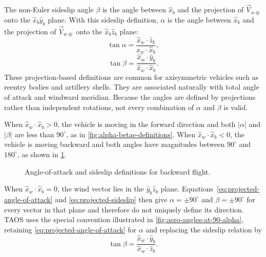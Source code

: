 
The non-Euler sideslip angle $\beta$ is the angle between $\hat x_b$ and the
projection of $\vec V_{w\oplus}$ onto the $\hat x_b\hat y_b$ plane. With this
sideslip definition, $\alpha$ is the angle between $\hat x_b$ and the projection of
$\vec V_{w\oplus}$ onto the $\hat x_b\hat z_b$ plane:
\begin{equation}
  \tan\alpha
  =\frac{\hat x_w\mathbin{\cdot}\hat z_b}
  {\hat x_w\mathbin{\cdot}\hat x_b},
  \label{eq:projected-angle-of-attack}
\end{equation}
\begin{equation}
  \tan\beta
  =\frac{\hat x_w\mathbin{\cdot}\hat y_b}
  {\hat x_w\mathbin{\cdot}\hat x_b}.
  \label{eq:projected-sideslip}
\end{equation}
These projection-based definitions are common for axisymmetric vehicles such as
reentry bodies and artillery shells. They are associated naturally with total angle of
attack and windward meridian. Because the angles are defined by projections rather
than independent rotations, not every combination of $\alpha$ and $\beta$ is valid.

When $\hat x_w\mathbin{\cdot}\hat x_b>0$, the vehicle is moving in the forward
direction and both $|\alpha|$ and $|\beta|$ are less than $90^\circ$, as in
\cref{fig:alpha-betae-definitions}. When
$\hat x_w\mathbin{\cdot}\hat x_b<0$, the vehicle is moving backward and both
angles have magnitudes between $90^\circ$ and $180^\circ$, as shown in
\cref{fig:alpha-beta-backward}.

\begin{figure}[htbp]
  \centering
  \resizebox{0.82\linewidth}{!}{}
  \caption{Angle-of-attack and sideslip definitions for backward flight.}
  \label{fig:alpha-beta-backward}
\end{figure}

When $\hat x_w\mathbin{\cdot}\hat x_b=0$, the wind vector lies in the
$\hat y_b\hat z_b$ plane. Equations~\eqref{eq:projected-angle-of-attack} and
\eqref{eq:projected-sideslip} then give $\alpha=\pm90^\circ$ and
$\beta=\pm90^\circ$ for every vector in that plane and therefore do not uniquely
define its direction. TAOS uses the special convention illustrated in
\cref{fig:aero-angles-at-90-alpha}, retaining
\cref{eq:projected-angle-of-attack} for $\alpha$ and replacing the sideslip
relation by
\begin{equation}
  \tan\beta
  =\frac{\hat x_w\mathbin{\cdot}\hat y_b}
  {\hat x_w\mathbin{\cdot}\hat z_b}.
  \label{eq:projected-sideslip-at-90-alpha}
\end{equation}

